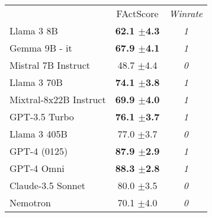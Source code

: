 \begin{NiceTabular}{lcc}
	\CodeBefore
	\Body
	\toprule
&FActScore & \textit{Winrate}\\
	Llama 3 8B & \textbf{62.1 \scriptsize{$\pm$4.3}} & \textit{1}\\
	Gemma 9B - it &\textbf{67.9 \scriptsize{$\pm$4.1}} & \textit{1}\\
	Mistral 7B Instruct &48.7 \scriptsize{$\pm$4.4} & \textit{0}\\
	\midrule
	Llama 3 70B & \textbf{74.1 \scriptsize{$\pm$3.8}} & \textit{1}\\
	Mixtral-8x22B Instruct &\textbf{69.9 \scriptsize{$\pm$4.0}} & \textit{1}\\
	GPT-3.5 Turbo &\textbf{76.1 \scriptsize{$\pm$3.7}} & \textit{1}\\
	\midrule
	Llama 3 405B & 77.0 \scriptsize{$\pm$3.7} & \textit{0}\\
	GPT-4 (0125) &\textbf{87.9 \scriptsize{$\pm$2.9}} & \textit{1}\\
	GPT-4 Omni &\textbf{88.3 \scriptsize{$\pm$2.8}} & \textit{1}\\
	Claude-3.5 Sonnet &80.0 \scriptsize{$\pm$3.5} & \textit{0}\\
	Nemotron &70.1 \scriptsize{$\pm$4.0} & \textit{0}\\
	\bottomrule
\end{NiceTabular}
